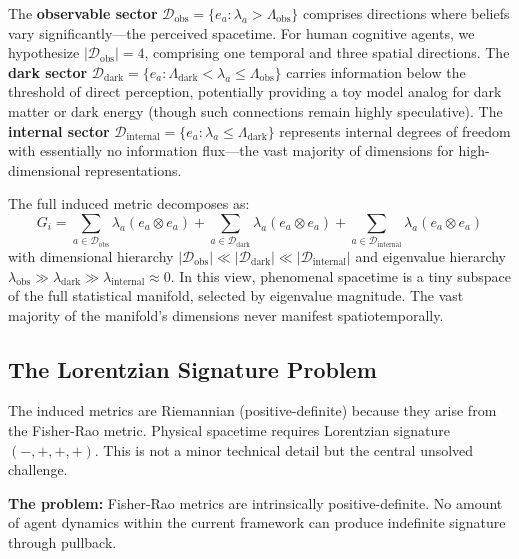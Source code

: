 \documentclass[11pt]{article}
\begin{document}
The \textbf{observable sector} $\mathcal{D}_{\text{obs}} = \{e_a : \lambda_a > \Lambda_{\text{obs}}\}$ comprises directions where beliefs vary significantly---the perceived spacetime. For human cognitive agents, we hypothesize $|\mathcal{D}_{\text{obs}}| = 4$, comprising one temporal and three spatial directions. The \textbf{dark sector} $\mathcal{D}_{\text{dark}} = \{e_a : \Lambda_{\text{dark}} < \lambda_a \leq \Lambda_{\text{obs}}\}$ carries information below the threshold of direct perception, potentially providing a toy model analog for dark matter or dark energy (though such connections remain highly speculative). The \textbf{internal sector} $\mathcal{D}_{\text{internal}} = \{e_a : \lambda_a \leq \Lambda_{\text{dark}}\}$ represents internal degrees of freedom with essentially no information flux---the vast majority of dimensions for high-dimensional representations.

The full induced metric decomposes as:
\begin{equation}
G_i = \sum_{a \in \mathcal{D}_{\text{obs}}} \lambda_a (e_a \otimes e_a)
+ \sum_{a \in \mathcal{D}_{\text{dark}}} \lambda_a (e_a \otimes e_a)
+ \sum_{a \in \mathcal{D}_{\text{internal}}} \lambda_a (e_a \otimes e_a)
\end{equation}
with dimensional hierarchy $|\mathcal{D}_{\text{obs}}| \ll |\mathcal{D}_{\text{dark}}| \ll |\mathcal{D}_{\text{internal}}|$ and eigenvalue hierarchy $\lambda_{\text{obs}} \gg \lambda_{\text{dark}} \gg \lambda_{\text{internal}} \approx 0$. In this view, phenomenal spacetime is a tiny subspace of the full statistical manifold, selected by eigenvalue magnitude. The vast majority of the manifold's dimensions never manifest spatiotemporally.

\subsection{The Lorentzian Signature Problem}
\label{sec:lorentzian}

The induced metrics are Riemannian (positive-definite) because they arise from the Fisher-Rao metric. Physical spacetime requires Lorentzian signature $(-,+,+,+)$. This is not a minor technical detail but the central unsolved challenge.

\textbf{The problem:} Fisher-Rao metrics are intrinsically positive-definite. No amount of agent dynamics within the current framework can produce indefinite signature through pullback.
\end{document}
